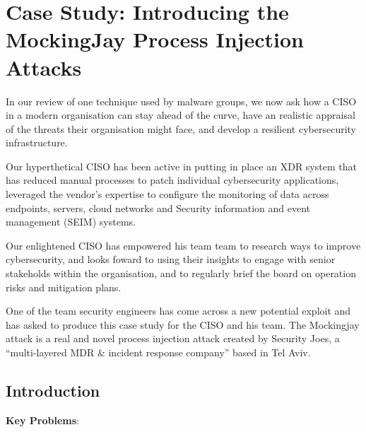 \section{Case Study: Introducing the MockingJay Process Injection Attacks}

In our review of one technique used by malware groups, we now ask how a CISO in a modern organisation can stay ahead of the curve,
have an realistic appraisal of the threats their organisation might face, and develop a resilient cybersecurity infrastructure.

Our hyperthetical CISO has been active in putting in place an XDR system that has reduced manual processes to patch individual cybersecurity
applications, leveraged the vendor's expertise to configure the monitoring of data across endpoints, servers, cloud networks and Security
information and event management (SEIM) systems.

Our enlightened CISO has empowered his team team to research ways to improve cybersecurity, and looks foward to using their insights to engage with
senior stakeholds within the organisation, and to regularly brief the board on operation risks and mitigation plans.  

One of the team security engineers has come across a new potential exploit and has asked to produce this case study for the CISO and his team.  The
Mockingjay attack \autocite{Peixoto:2023} is a real and novel process injection attack created by Security Joes, a
``multi-layered MDR \& incident response company'' based in Tel Aviv.

\subsection{Introduction}


\textbf{Key Problems}:

